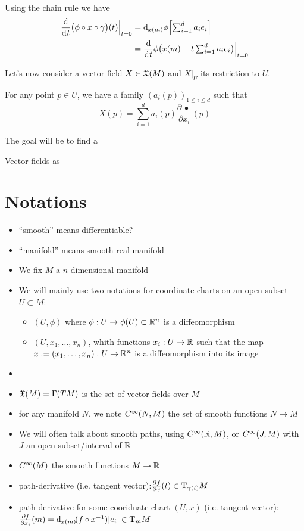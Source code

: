 		Using the chain rule we have
		\begin{align*}
			\frac{\d}{\di{t}} \big( \phi \circ x \circ \gamma \big)(t) \Big|_{t=0} &= \di[x(m)]{\phi} \Big[ {\textstyle\sum_{i=1}^d a_i e_i} \Big] \\
			                                                                       &= \frac{\d}{\di{t}} \phi\big( x(m) + {\textstyle t \sum_{i=1}^d a_i e_i} \big) \Big|_{t=0}
		\end{align*}

		Let's now consider a vector field $X \in \mathfrak{X}(M)$ and $X|_U$ its restriction to $U$.

		For any point $p \in U$, we have a family $(a_i(p))_{1 \leq i \leq d}$ such that
		$$
			X(p) = \sum_{i=1}^d a_i(p) \frac{\partial \,\bullet\,}{\partial{x_i}}(p)
		$$

		The goal will be to find a 

		Vector fields as 

\section{Notations}

	\begin{itemize}
		\item ``smooth'' means differentiable?
		\item ``manifold'' means smooth real manifold
		\item We fix $M$ a $n$-dimensional manifold
		\item We will mainly use two notations for coordinate charts on an open subset $U \subset M$:
			\begin{itemize}
				\item $(U, \phi)$ where $\phi: U \to \phi(U) \subset \mathbb{R}^n$ is a diffeomorphism
				\item $(U, x_1, \ldots, x_n)$, whith functions $x_i: U \to \mathbb{R}$ such that the map $x := (x_1, \ldots, x_n) : U \to \mathbb{R}^n$ is a diffeomorphism into its image
			\end{itemize}
		\item {}
		\item $\mathfrak{X}(M) = \Gamma(TM)$ is the set of vector fields over $M$
		\item for any manifold $N$, we note $C^\infty(N, M)$ the set of smooth functions $N \to M$ 
		\item We will often talk about smooth paths, using $C^\infty(\mathbb{R}, M)$, or $C^\infty(J, M)$ with $J$ an open subset/interval of $\mathbb{R}$
		\item $C^\infty(M)$ the smooth functions $M \to \mathbb{R}$
		\item path-derivative (i.e. tangent vector):$\frac{\partial{f}}{\partial{\gamma}}(t) \in \mathrm{T}_{\gamma(t)}{M}$
		\item path-derivative for some cooridnate chart $(U,x)$ (i.e. tangent vector): $\frac{\partial{f}}{\partial{x_i}}(m) = \di[x(m)](f \circ x^{-1})[e_i] \in \T_m{M}$
	\end{itemize}

